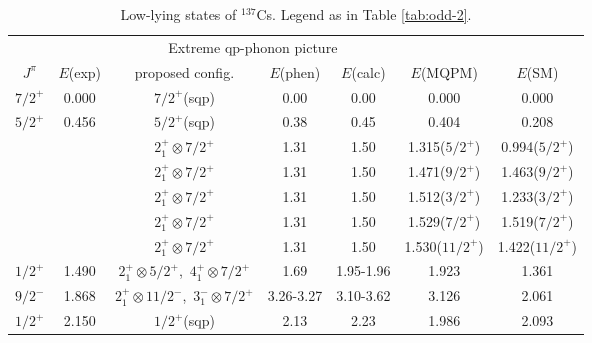 \begin{table}[htbp]
\begin{center}
\caption{Low-lying states of $^{137}$Cs. Legend as in Table \ref{tab:odd-2}.}
\begin{tabular}{cc|cccc|c}
\hline
& & \multicolumn{3}{c}{Extreme qp-phonon picture} & & \\
$J^{\pi}$ & $E$(exp) & proposed config. & $E$(phen) & $E$(calc) 
& $E$(MQPM) & $E$(SM) \\ 
\hline
$7/2^{+}$ & 0.000 & $7/2^+$(sqp) & 0.00 & 0.00 & 0.000 & 0.000 \\
$5/2^{+}$ & 0.456 & $5/2^+$(sqp) & 0.38 & 0.45 & 0.404 & 0.208 \\
& & $2^+_1\otimes 7/2^+$ & 1.31 & 1.50 & 1.315($5/2^+$) & 0.994($5/2^+$) \\
& & $2^+_1\otimes 7/2^+$ & 1.31 & 1.50 & 1.471($9/2^+$) & 1.463($9/2^+$) \\
& & $2^+_1\otimes 7/2^+$ & 1.31 & 1.50 & 1.512($3/2^+$) & 1.233($3/2^+$) \\
& & $2^+_1\otimes 7/2^+$ & 1.31 & 1.50 & 1.529($7/2^+$) & 1.519($7/2^+$) \\
& & $2^+_1\otimes 7/2^+$ & 1.31 & 1.50 & 1.530($11/2^+$) & 1.422($11/2^+$) \\
$1/2^{+}$ & 1.490 & $2^+_1\otimes 5/2^+$,\ $4^+_1\otimes 7/2^+$ 
& 1.69 & 1.95-1.96 & 1.923 & 1.361 \\
$9/2^{-}$ & 1.868 & $2^+_1\otimes 11/2^-$,\ $3^-_1\otimes 7/2^+$ 
& 3.26-3.27 & 3.10-3.62 & 3.126 & 2.061 \\
$1/2^{+}$ & 2.150 & $1/2^+$(sqp) & 2.13 & 2.23 & 1.986 & 2.093 \\
\hline
\end{tabular}
\label{tab:odd-3}
\end{center}
\end{table}
